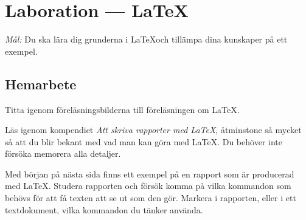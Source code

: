 \section{Laboration  --- \LaTeX}

\emph{Mål:} Du ska lära dig grunderna i \LaTeX och tillämpa dina kunskaper på ett exempel.


\subsection*{Hemarbete}
\begin{Hemarbete}\firmlist
	\item Titta igenom föreläsningsbilderna till föreläsningen om \LaTeX.
	\item Läs igenom kompendiet \emph{Att skriva rapporter med \LaTeX}, åtminstone så mycket så att du blir bekant med vad man kan göra med \LaTeX. Du behöver inte försöka memorera alla detaljer.
	\item \label{hem:latexuppg} Med början på nästa sida finns ett exempel på en rapport som är producerad med \LaTeX. Studera rapporten och försök komma på vilka kommandon som behövs för att få texten att se ut som den gör. Markera i rapporten, eller i ett textdokument, vilka kommandon du tänker använda.
\end{Hemarbete}

